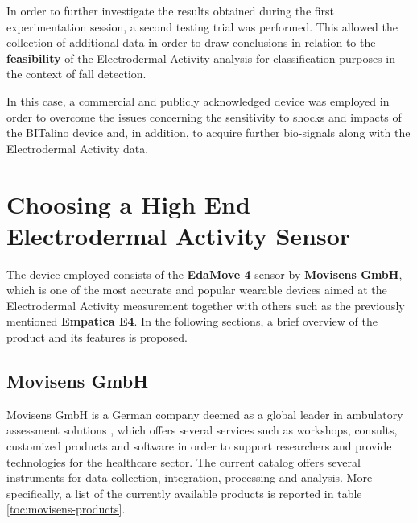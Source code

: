 \label{ch:collection}

In order to further investigate the results obtained during the first experimentation session, a second testing trial was performed. This allowed the collection of additional data in order to draw conclusions in relation to the \textbf{feasibility} of the Electrodermal Activity analysis for classification purposes in the context of fall detection.

In this case, a commercial and publicly acknowledged device was employed in order to overcome the issues concerning the sensitivity to shocks and impacts of the BITalino device and, in addition, to acquire further bio-signals along with the Electrodermal Activity data.

\section{Choosing a High End Electrodermal Activity Sensor}\label{sec:movisens}

The device employed consists of the \textbf{EdaMove 4} sensor by \textbf{Movisens GmbH}, which is one of the most accurate and popular wearable devices aimed at the Electrodermal Activity measurement together with others such as the previously mentioned \textbf{Empatica E4}. In the following sections, a brief overview of the product and its features is proposed.

\subsection{Movisens GmbH}\label{subsec:movisens-company}

Movisens GmbH is a German company deemed as a global leader in ambulatory assessment solutions \cite{movisens}, which offers several services such as workshops, consults, customized products and software in order to support researchers and provide technologies for the healthcare sector.
The current catalog offers several instruments for data collection, integration, processing and analysis. More specifically, a list of the currently available products is reported in table \ref{toc:movisens-products}.

